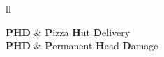 \begin{abbreviations}{ll} %

\textbf{PHD} & \textbf{P}izza \textbf{H}ut \textbf{D}elivery\\
\textbf{PHD} & \textbf{P}ermanent \textbf{H}ead \textbf{D}amage

\end{abbreviations}